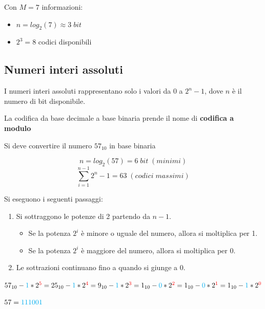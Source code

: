 \documentclass[a4paper]{article}
\theoremstyle{break}
\theoremstyle{break}
\theoremstyle{break}
\theoremstyle{break}
\begin{document}
\begin{example}
	Con \( M=7 \) informazioni:
	\begin{itemize}
		\item \( n=log_2{(7)} \approx 3\; bit \)
		\item \( 2^3=8 \) codici disponibili
	\end{itemize}
\end{example}

\subsection{Numeri interi assoluti}
I numeri interi assoluti rappresentano solo i valori da \( 0 \) a \( 2^n-1 \),
dove \( n \) è il numero di bit disponibile.

La codifica da base decimale a base binaria prende il nome di \textbf{codifica
	a modulo}

\begin{example}
	\label{ex:57modulo}
	Si deve convertire il numero \( 57_{10} \) in base binaria
	\begin{center}
		\[ n=log_2{(57)} = 6\; bit\; (minimi)
 \]
 \[ \sum_{i=1}^{n-1} 2^n-1 = 63\; (codici\; massimi)\]
	\end{center}
	Si eseguono i seguenti passaggi:
	\begin{enumerate}
		\item Si sottraggono le potenze di 2 partendo da \( n-1 \).
		      \begin{itemize}
			      \item Se la potenza \( 2^i \) è minore o uguale del numero,
			            allora si moltiplica per 1.
			      \item Se la potenza \( 2^i \) è maggiore del numero,
			            allora si moltiplica per 0.
		      \end{itemize}
		\item Le sottrazioni continuano fino a quando si giunge a 0.
	\end{enumerate}
	\(57_{10}-{\textcolor{cyan}{1}}*2^{\textcolor{red}{5}}
		=25_{10}-{\textcolor{cyan}{1}}*2^{\textcolor{red}{4}}
		=9_{10}-{\textcolor{cyan}{1}}*2^{\textcolor{red}{3}}
		=1_{10}-{\textcolor{cyan}{0}}*2^{\textcolor{red}{2}}
		=1_{10}-{\textcolor{cyan}{0}}*2^{\textcolor{red}{1}}
		=1_{10}-{\textcolor{cyan}{1}}*2^{\textcolor{red}{0}}\)

    \begin{center}
       \( 57= \textcolor{cyan}{111001} \) 
   \end{center}
\end{example}
\end{document}
